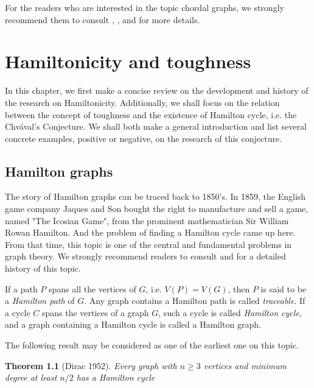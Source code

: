 \documentclass[12pt]{report}
\newtheorem{theorem}{Theorem}
\begin{document}
For the readers who are interested in the topic chordal graphs, we strongly recommend them to consult \cite{bauer2000chordality}, \cite{bauer2000not}, \cite{bohme1999more} and \cite{chen1998tough} for more details.












\chapter{Hamiltonicity and toughness}\label{c2ht}
In this chapter, we first make a concise review on the development and history of the research on Hamiltonicity. Additionally, we shall  focus on the relation between the concept of toughness and the existence of Hamilton cycle, i.e. the Chv{\'a}val's Conjecture. We shall both  make a general introduction and list several concrete examples, positive or negative, on the research of this conjecture.

\section{Hamilton graphs}

The story of Hamilton graphs can be traced back to 1850's. In 1859, the English game company Jaques and Son bought the right to manufacture and sell a game, named "The Icosian Game", from the prominent mathematician Sir William Rowan Hamilton. And the problem of finding a Hamilton cycle came up here. From that time, this topic is one of the central and fundamental problems in graph theory. We strongly recommend readers to consult \cite{gould1991updating} and \cite{bauer2006toughness} for a detailed history of this topic.

If a path $P$ spans all the vertices of $G$, i.e. $V(P)=V(G)$, then $P$ is said to be a {\em Hamilton path} of $G$. Any graph contains a Hamilton path is called {\em traceable}. If a cycle $C$ spans the vertices of a graph $G$, such a cycle is called {\em Hamilton cycle}, and a graph containing a Hamilton cycle is called a Hamilton graph.

The following result may be considered as one of the earliest one on this topic.

\begin{theorem}[Dirac 1952]\label{dirac1952th}
Every graph with $n\ge3$ vertices and minimum degree at least $n/2$ has a Hamilton cycle
\end{theorem}
\end{document}
